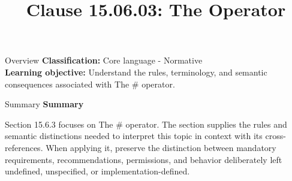 \documentclass[10pt,letterpaper]{article}
\title{Clause 15.06.03: The Operator}
\author{}
\date{}
\begin{document}
\maketitle
\begin{CornellOverviewBox}{Overview}
\textbf{Classification:} Core language - Normative\\[2pt]
\textbf{Learning objective:} Understand the rules, terminology, and semantic consequences associated with The \# operator.
\end{CornellOverviewBox}\begin{CornellSummaryBox}{Summary}
{\sffamily\bfseries\color{Accent} Summary}\par\vspace{3pt}Section 15.6.3 focuses on The \# operator. The section supplies the rules and semantic distinctions needed to interpret this topic in context with its cross-references. When applying it, preserve the distinction between mandatory requirements, recommendations, permissions, and behavior deliberately left undefined, unspecified, or implementation-defined.
\end{CornellSummaryBox}
\end{document}
